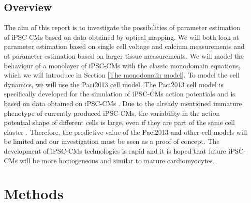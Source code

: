 \documentclass[12pt,a4paper]{article}
\begin{document}
\subsection{Overview}
The aim of this report is to investigate the possibilities of parameter estimation of iPSC-CMs based on data obtained by optical mapping. We will both look at parameter estimation based on single cell voltage and calcium measurements and at parameter estimation based on larger tissue measurements.
We will model the behaviour of a monolayer of iPSC-CMs with the classic monodomain equations, which we will introduce in Section \ref{The monodomain model}. To model the cell dynamics, we will use the Paci2013 cell model. The Paci2013 cell model is specifically developed for the simulation of iPSC-CMs action potentials and is based on data obtained on iPSC-CMs \cite{Paci2013, Ma2011}. Due to the already mentioned immature phenotype of currently produced iPSC-CMs, the variability in the action potential shape of different cells is large, even if they are part of the same cell cluster \cite{Blazeski, Zhu2016}. Therefore, the predictive value of the Paci2013 and other cell models will be limited and our investigation must be seen as a proof of concept. The development of iPSC-CMs technologies is rapid and it is hoped that future iPSC-CMs will be more homogeneous and similar to mature cardiomyocytes\cite{Denning2016}. 
%
\section{Methods} \label{Methods}
\end{document}
